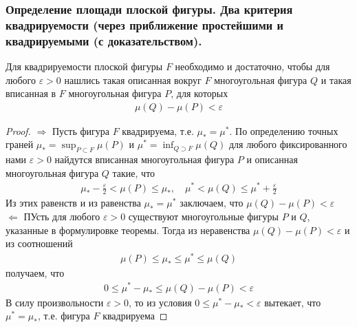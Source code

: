 \documentclass[10pt]{article}
\begin{document}
    \subsubsection{Определение площади плоской фигуры. Два критерия квадрируемости (через приближение простейшими и квадрируемыми (с доказательством).}
    \begin{definition}
    \end{definition}
    \begin{theorem}
        \label{th:quadracity_crit}
        Для квадрируемости плоской фигуры $F$ необходимо и достаточно, чтобы для любого $\varepsilon > 0$ нашлись такая описанная вокруг $F$ многоугольная фигура $Q$ и такая вписанная в $F$ многоугольная фигура $P$, для которых
        \begin{gather*}
            \mu(Q) - \mu(P) < \varepsilon
        \end{gather*}
    \end{theorem}
    \begin{proof}
        $\Rightarrow$
        Пусть фигура $F$ квадрируема, т.е. $\mu_*=\mu^*$. По определению точных граней $\mu_*=\sup_{P \subset F} \mu(P)$ и $\mu^*=\inf_{Q \supset F} \mu(Q)$ для любого фиксированного нами $\varepsilon > 0$ найдутся вписанная многоугольная фигура $P$ и описанная многоугольная фигура $Q$ такие, что
        \begin{gather*}
            \mu_* - \frac{\varepsilon}{2} < \mu(P) \leq \mu_*, \quad \mu^* < \mu(Q) \leq \mu^* + \frac{\varepsilon}{2}
        \end{gather*}
        Из этих равенств и из равенства $\mu_* = \mu^*$ заключаем, что $\mu(Q) - \mu(P) < \varepsilon$\\
        $\Leftarrow$
        ПУсть для любого $\varepsilon > 0$ существуют многоугольные фигуры $P$ и $Q$, указанные в формулировке теоремы. Тогда из неравенства $\mu(Q) - \mu(P) < \varepsilon$ и из соотношений
        \begin{gather*}
            \mu(P) \leq \mu_* \leq \mu^* \leq \mu(Q)
        \end{gather*}
        получаем, что
        \begin{gather*}
            0 \leq \mu^* - \mu_* \leq \mu(Q) - \mu(P) < \varepsilon
        \end{gather*}
        В силу произвольности $\varepsilon > 0$, то из условия $0 \leq \mu^* - \mu_* < \varepsilon$ вытекает, что $\mu^* = \mu_*$, т.е. фигура $F$ квадрируема
    \end{proof}
\end{document}
